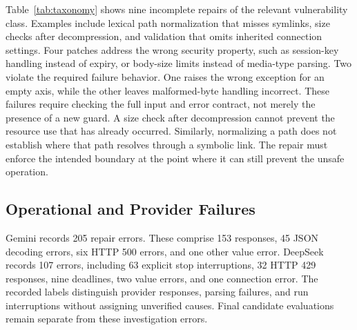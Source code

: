 Table~\ref{tab:taxonomy} shows nine incomplete repairs of the relevant vulnerability class. Examples include lexical path normalization that misses symlinks, size checks after decompression, and validation that omits inherited connection settings. Four patches address the wrong security property, such as session-key handling instead of expiry, or body-size limits instead of media-type parsing. Two violate the required failure behavior. One raises the wrong exception for an empty axis, while the other leaves malformed-byte handling incorrect. These failures require checking the full input and error contract, not merely the presence of a new guard.
A size check after decompression cannot prevent the resource use that has already occurred. Similarly, normalizing a path does not establish where that path resolves through a symbolic link. The repair must enforce the intended boundary at the point where it can still prevent the unsafe operation.

\subsection{Operational and Provider Failures}
Gemini records 205 repair errors. These comprise 153  responses, 45 JSON decoding errors, six HTTP 500 errors, and one other value error. DeepSeek records 107 errors, including 63 explicit stop interruptions, 32 HTTP 429 responses, nine deadlines, two value errors, and one connection error. The recorded labels distinguish provider responses, parsing failures, and run interruptions without assigning unverified causes. Final candidate evaluations remain separate from these investigation errors.




